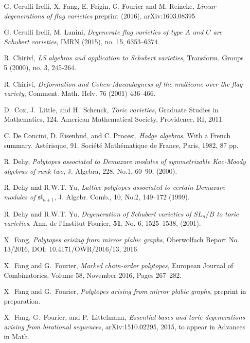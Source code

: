 \documentclass{emsprocart}
\theoremstyle{definition}
\begin{document}
\begin{thebibliography}{7}
G. Cerulli Irelli, X. Fang, E. Feigin, G. Fourier and M. Reineke,
\emph{Linear degenerations of flag varieties}
preprint (2016), arXiv:1603.08395 
    
G. Cerulli Irelli, M. Lanini,
{\it Degenerate flag varieties of type $A$ and $C$ are Schubert varieties}, 
IMRN (2015), no. 15, 6353--6374.

R. Chiriv\`i,
\textit{\it LS algebras and application to Schubert varieties}, Transform. Groups
5 (2000), no. 3, 245-264.

R. Chiriv\`i,
\textit{Deformation and Cohen-Macaulayness of the multicone over the flag variety},
Comment. Math. Helv. 76 (2001) 436--466.

D.~Cox, J.~Little, and H.~Schenck, {\it Toric varieties}, Graduate Studies in Mathematics, 124. American Mathematical Society,
Providence, RI, 2011.

C. De Concini, D. Eisenbud, and C. Procesi,
\textit{Hodge algebras}.
With a French summary. Ast\'erisque, 91. Soci\'et\'e Math\'ematique de France, Paris, 1982, 87 pp.

 R. Dehy, \textit{Polytopes associated to Demazure modules of symmetrizable Kac-Moody
algebras of rank two}, J. Algebra, 228, No.1, 60--90, (2000).

R. Dehy and R.W.T. Yu,  \textit{Lattice polytopes associated to certain Demazure modules
of $\mathfrak{sl}_{n+1}$}, J. Algebr. Comb., 10, No.2, 149--172 (1999).

R. Dehy and R.W.T. Yu, \textit{Degeneration of Schubert varieties of $SL_n/B$ to toric varieties},
Ann. de l'Institut Fourier, {\bf 51}, No. 6, 1525--1538, (2001).

X.~Fang,
{\it Polytopes arising from mirror plabic graphs}, 
Oberwolfach Report No. 13/2016, DOI: 10.4171/OWR/2016/13, 2016.

X.~Fang and G.~Fourier,
{\it Marked chain-order polytopes,} European Journal of Combinatorics, Volume 58, November 2016, Pages 267--282.

X.~Fang and G.~Fourier,
{\it Polytopes arising from mirror plabic graphs},
preprint in preparation.

X.~Fang, G.~Fourier, and P.~Littelmann, \textit{Essential bases and toric degenerations arising from birational
sequences}, arXiv:1510.02295, 2015, to appear in Advances in Math.


\end{thebibliography}
\end{document}
